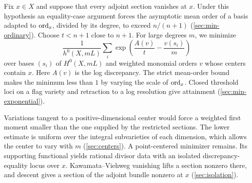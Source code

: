 \documentclass[11pt,a4paper]{amsart}
\begin{document}
Fix $x\in X$ and suppose that every adjoint section vanishes at $x$. Under this hypothesis an equality-case argument forces the asymptotic mean order of a basis adapted to $\operatorname{ord}_x$, divided by its degree, to exceed $n/(n+1)$ (\cref{sec:min-ordinary}). Choose $t<n+1$ close to $n+1$. For large degrees $m$, we minimize
\[
 \frac{1}{h^0(X,mL)}
 \sum_i\exp\!\left(\frac{A(v)}{t}-\frac{v(s_i)}{m}\right)
\]
over bases $(s_i)$ of $H^0(X,mL)$ and weighted monomial orders $v$ whose centers contain $x$. Here $A(v)$ is the log discrepancy. The strict mean-order bound makes the minimum less than $1$ by varying the scale of $\operatorname{ord}_x$. Closed threshold loci on a flag variety and retraction to a log resolution give attainment (\cref{sec:min-exponential}).

Variations tangent to a positive-dimensional center would force a weighted first moment smaller than the one supplied by the restricted sections. The lower estimate is uniform over the integral subvarieties of each dimension, which allows the center to vary with $m$ (\cref{sec:centers}). A point-centered minimizer remains. Its supporting functional yields rational divisor data with an isolated discrepancy-equality locus over $x$. Kawamata--Viehweg vanishing lifts a section nonzero there, and descent gives a section of the adjoint bundle nonzero at $x$ (\cref{sec:isolation}).






\printbibliography
\end{document}
